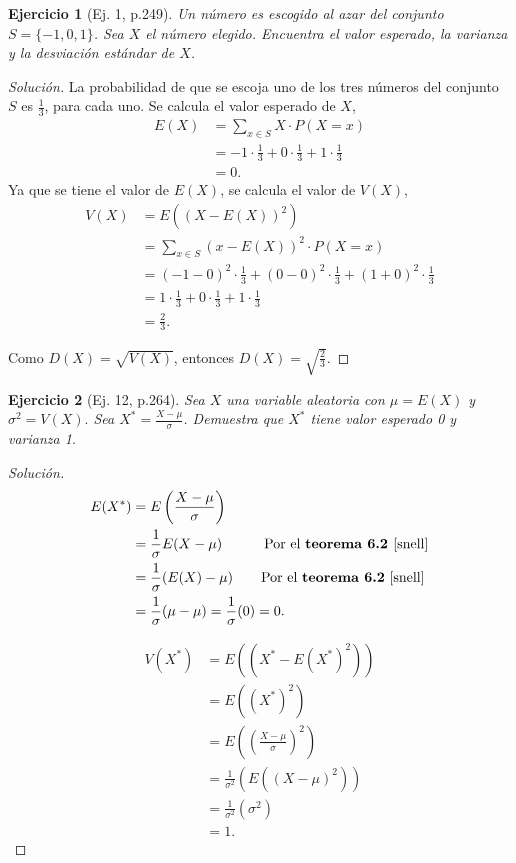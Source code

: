 \documentclass[12pt,letterpaper]{article}
\newtheorem{ej}{Ejercicio}
\begin{document}
\begin{ej}[Ej. 1, p.249]
Un número es escogido al azar del conjunto $S=\{-1,0,1\}$. Sea $X$ el número elegido. Encuentra el valor esperado, la varianza y la desviación estándar de $X$.
\end{ej}
\begin{proof}[Solución]
La probabilidad de que se escoja uno de los tres números del conjunto $S$ es $\frac{1}{3}$, para cada uno. Se calcula el valor esperado de $X$,
\begin{align}
E(X) &= \sum_{x \in S} X\cdot P(X=x) \\ &= -1 \cdot \frac{1}{3} + 0\cdot \frac{1}{3} + 1 \cdot\frac{1}{3} \\ &=0.
\end{align}
Ya que se tiene el valor de $E(X)$, se calcula el valor de $V(X)$,
\begin{align}
V(X) &= E((X-E(X))^2) \\ &= \sum_{x \in S} (x-E(X))^2 \cdot P(X=x) \\&= (-1-0)^2\cdot\frac{1}{3} + (0-0)^2\cdot\frac{1}{3} + (1+0)^2\cdot \frac{1}{3} \\ &= 1\cdot \frac{1}{3} + 0\cdot \frac{1}{3} + 1\cdot \frac{1}{3} \\ &=\frac{2}{3}.
\end{align}

Como $D(X) = \sqrt{V(X)}$, entonces $D(X)=\sqrt{\frac{2}{3}}$.
\end{proof}

\begin{ej}[Ej. 12, p.264]
Sea $X$ una variable aleatoria con $\mu = E(X)$ y $\sigma^2 = V(X).$ Sea $X^* = \frac{X-\mu}{\sigma}$. Demuestra que $X^*$ tiene valor esperado 0 y varianza 1. 
\end{ej}
\begin{proof}[Solución]
\begin{align}
E(X^*) &= E\left(\frac{X-\mu}{\sigma}\right) \\ &= \frac{1}{\sigma} E(X - \mu) \qquad \quad\text{Por el \textbf{teorema 6.2 }\cite{snell}} \\&= \frac{1}{\sigma} (E(X) - \mu) \qquad \text{Por el \textbf{teorema 6.2} \cite{snell}} \\ &= \frac{1}{\sigma}(\mu - \mu) = \frac{1}{\sigma} (0) = 0.
\end{align}

\begin{align}
V(X^*)&=E((X^* - E(X^*)^2)) \\ &= E((X^*)^2) \\ &= E\left(\left( \frac{X-\mu}{\sigma} \right)^2\right) \\ &= \frac{1}{\sigma^2} \left(E\left(\left(X-\mu\right)^2\right)\right) \\ &= \frac{1}{\sigma^{2}} \left(\sigma^{2}\right) \\ &=1.
\end{align}
\end{proof}
 

\end{document}
